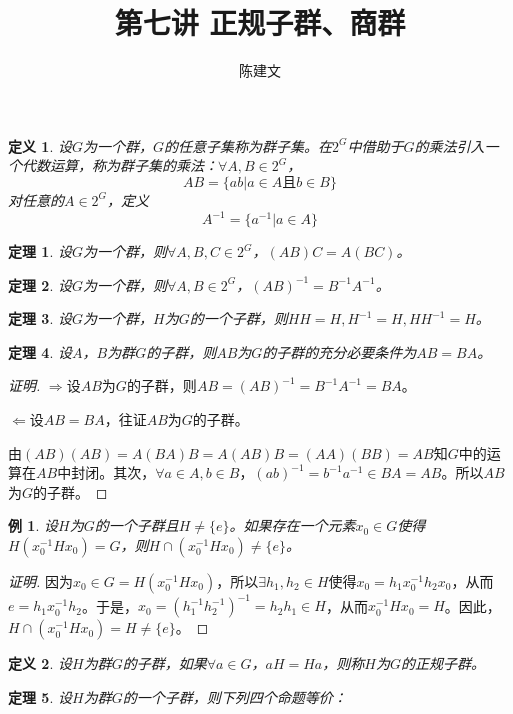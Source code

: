 \documentclass{article}
\newtheorem{Def}{定义}
\newtheorem{Thm}{定理}
\newtheorem*{Example}{例}
\begin{document}
\begin{CJK*}{UTF8}{gbsn}
  \title{第七讲 正规子群、商群}
  \author{陈建文}
  \maketitle
  \begin{Def}
    设$G$为一个群，$G$的任意子集称为群子集。在$2^G$中借助于$G$的乘法引入一个代数运算，称为群子集的乘法：$\forall A,B\in 2^G$，
    \[AB=\{ab|a\in A \text{且} b\in B\}\]
    对任意的$A\in 2^G$，定义
  \[A^{-1}=\{a^{-1}|a\in A\}\]
  \end{Def}
  
  \begin{Thm}
    设$G$为一个群，则$\forall A,B,C\in 2^G$，$(AB)C=A(BC)$。
  \end{Thm}
  
  \begin{Thm}
    设$G$为一个群，则$\forall A,B\in 2^G$，$(AB)^{-1}=B^{-1}A^{-1}$。
  \end{Thm}
  
  \begin{Thm}
    设$G$为一个群，$H$为$G$的一个子群，则$HH=H,H^{-1}=H,HH^{-1}=H$。
  \end{Thm}
  
  \begin{Thm}
  设$A$，$B$为群$G$的子群，则$AB$为$G$的子群的充分必要条件为$AB=BA$。
  \end{Thm}
  \begin{proof}[证明]
    $\Rightarrow$设$AB$为$G$的子群，则$AB=(AB)^{-1}=B^{-1}A^{-1}=BA$。
  
  $\Leftarrow$设$AB=BA$，往证$AB$为$G$的子群。
  
  由$(AB)(AB)=A(BA)B=A(AB)B=(AA)(BB)=AB$知$G$中的运算在$AB$中封闭。其次，$\forall a\in A, b\in B$，$(ab)^{-1}=b^{-1}a^{-1}\in BA=AB$。所以$AB$为$G$的子群。
  \end{proof}
  \begin{Example}
  设$H$为$G$的一个子群且$H\neq \{e\}$。如果存在一个元素$x_0\in G$使得$H(x_0^{-1}Hx_0)=G$，则$H\cap (x_0^{-1}Hx_0)\neq \{e\}$。
  \end{Example}
  \begin{proof}[证明]
    因为$x_0\in G=H(x_0^{-1}Hx_0)$，所以$\exists h_1,h_2\in H$使得$x_0=h_1x_0^{-1}h_2x_0$，从而$e=h_1x_0^{-1}h_2$。于是，$x_0=(h_1^{-1}h_2^{-1})^{-1}=h_2h_1\in H$，从而$x_0^{-1}Hx_0=H$。因此，$H\cap (x_0^{-1}Hx_0)=H\neq \{e\}$。
  \end{proof}
  \begin{Def}
    设$H$为群$G$的子群，如果$\forall a\in G$，$aH=Ha$，则称$H$为$G$的正规子群。
  \end{Def}
  \begin{Thm}
   设$H$为群$G$的一个子群，则下列四个命题等价：
  

\end{Thm}
\end{CJK*}
\end{document}
